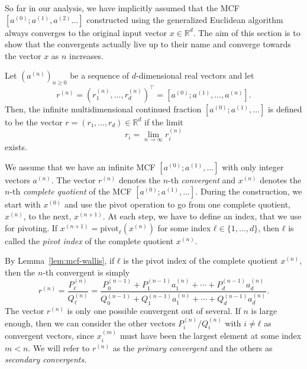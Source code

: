 So far in our analysis, we have implicitly assumed that the MCF $[a^{(0)}; a^{(1)}, a^{(2)} …]$
constructed using the generalized Euclidean algorithm always converges to the
original input vector $x ∈ ℝ^d$.
The aim of this section is to show that the convergents actually live up to
their name and converge towards the vector $x$ as $n$ increases.

\begin{definition}
  Let $(a^{(n)})_{n ≥ 0}$ be a sequence of $d$-dimensional real vectors
  and let
  \[
    r^{(n)} = (r_1^{(n)}, …, r_d^{(n)})^⊤ = [a^{(0)}; a^{(1)}, …, a^{(n)}].
  \]
  Then, the infinite multidimensional continued fraction $[a^{(0)}; a^{(1)}, …]$ is defined to be
  the vector $r = (r₁, …, r_d) ∈ ℝ^d$ if the limit
  \[
    r_i = \lim_{n → ∞} r_i^{(n)}
  \]
  exists.
\end{definition}

We assume that we have an infinite MCF $[a^{(0)}; a^{(1)}, …]$
with only integer vectors $a^{(n)}$.
The vector $r^{(n)}$ denotes the $n$-th \emph{convergent}
and $x^{(n)}$ denotes the $n$-th \emph{complete quotient} of the MCF $[a^{(0)}; a^{(1)}, …]$.
During the construction, we start with $x^{(0)}$ and use the pivot operation to
go from one complete quotient, $x^{(n)}$, to the next, $x^{(n+1)}$.
At each step, we have to define an index, that we use for pivoting.
If $x^{(n+1)} = \mathrm{pivot}_ℓ(x^{(n)})$ for some index $ℓ ∈ \{1, …, d\}$,
then $ℓ$ is called the \emph{pivot index} of the complete quotient $x^{(n)}$.

By Lemma~\ref{lem:mcf-wallis},
if $ℓ$ is the pivot index of the complete quotient $x^{(n)}$,
then the $n$-th convergent is simply
\[
  r^{(n)}
  = \frac{P_ℓ^{(n)}}{Q_ℓ^{(n)}}
  = \frac{P_0^{(n-1)} + P_1^{(n-1)} a_1^{(n)} + ⋯ + P_d^{(n-1)} a_d^{(n)}}{Q_0^{(n-1)} + Q_1^{(n-1)} a_1^{(n)} + ⋯ + Q_d^{(n-1)} a_d^{(n)}}.
\]
The vector $r^{(n)}$ is only one possible convergent out of several.
If $n$ is large enough, then we can consider the other vectors
$P_i^{(n)}/Q_i^{(n)}$ with $i ≠ ℓ$ as convergent vectors,
since $x_i^{(m)}$ must have been the largest element at some index $m < n$.
We will refer to $r^{(n)}$ as the \emph{primary convergent} and the others as
\emph{secondary convergents}.

